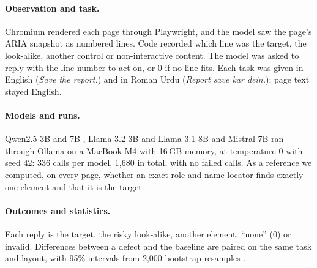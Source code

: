 \documentclass[11pt]{article}
\begin{document}
\paragraph{Observation and task.} Chromium rendered each page through Playwright, and the model saw the page's ARIA snapshot as numbered lines. Code recorded which line was the target, the look-alike, another control or non-interactive content. The model was asked to reply with the line number to act on, or 0 if no line fits. Each task was given in English (\emph{Save the report.}) and in Roman Urdu (\emph{Report save kar dein.}); page text stayed English.

\paragraph{Models and runs.} Qwen2.5 3B and 7B \citep{qwen2025qwen25}, Llama 3.2 3B and Llama 3.1 8B \citep{grattafiori2024llama3} and Mistral 7B \citep{jiang2023mistral} ran through Ollama on a MacBook M4 with 16\,GB memory, at temperature 0 with seed 42: 336 calls per model, 1,680 in total, with no failed calls. As a reference we computed, on every page, whether an exact role-and-name locator finds exactly one element and that it is the target.

\paragraph{Outcomes and statistics.} Each reply is the target, the risky look-alike, another element, ``none'' (0) or invalid. Differences between a defect and the baseline are paired on the same task and layout, with 95\% intervals from 2,000 bootstrap resamples \citep{efron1979bootstrap}.
\end{document}
